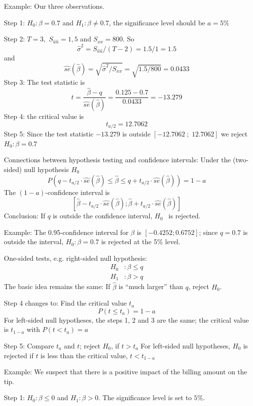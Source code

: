 \documentclass{article}
\begin{document}
Example: Our three observations.

Step 1: $H_{0}:\beta =0.7$ and $H_{1}:\beta \neq 0.7$, the significance
level should be $a=5\%$

Step 2: $T=3,$ $S_{\hat{u}\hat{u}}=1,5$ and $S_{xx}=800$. So%
\[
\hat{\sigma}^{2}=S_{\hat{u}\hat{u}}/\left( T-2\right) =1.5/1=1.5 
\]%
and%
\[
\widehat{se}(\hat{\beta})=\sqrt{\hat{\sigma}^{2}/S_{xx}}=\sqrt{1.5/800}%
=0.0433 
\]%
Step 3: The test statistic is%
\[
t=\frac{\hat{\beta}-q}{\widehat{se}(\hat{\beta})}=\frac{0.125-0.7}{0.0433}%
=-13.279 
\]%
Step 4: the critical value is%
\[
t_{a/2}=12.7062 
\]%
Step 5: Since the test statistic $-13.279$ is outside $[-12.7062\;;%
\;12.7062] $ we reject $H_{0}:\beta =0.7$

Connections between hypothesis testing and confidence intervals:
Under the (two-sided) null hypothesis $H_0$
\[ P(q-t_{a/2}\cdot \widehat{se}(\hat\beta)\le \hat\beta\le q+t_{a/2}\cdot \widehat{se}(\hat\beta))=1-a \]
The $(1-a)$-confidence interval is
\[ [\hat\beta-t_{a/2}\cdot \widehat{se}(\hat\beta); \hat\beta+t_{a/2}\cdot \widehat{se}(\hat\beta) ]\]
Conclusion: If $q$ is outside the confidence interval, $H_{0\text{ }}$%
is rejected.

Example: The 0.95-confidence interval for $\beta $ is $[-0.4252;0.6752]$; since $%
q=0.7 $ is outside the interval, $H_{0}:\beta =0.7$ is rejected at the 5\%
level.

One-sided tests, e.g. right-sided null hypothesis:
\begin{align*}
H_0 &: \beta\le q\\
H_1 &: \beta> q
\end{align*}
The basic idea remains the same: If $\hat{\beta}$ is \enquote{much larger} than $q$, reject $H_{0}$.

Step 4 changes to: Find the critical value $t_{a}$%
\begin{equation*}
P(t\leq t_{a})=1-a
\end{equation*}%
For left-sided null hypotheses, the steps 1, 2 and 3 are the same; the
critical value is $t_{1-a}$ with $P(t<t_{a})=a$

Step 5: Compare $t_{a}$ and $t$; reject $H_{0}$, if $t>t_{a}$
For left-sided null hypotheses, $H_{0}$ is rejected if $t$ is less
than the critical value, $t<t_{1-a}$

Example:
We suspect that there is a positive impact of the billing amount on the tip.

Step 1: $H_{0}:\beta \leq 0$ and $H_{1}:\beta >0$. The significance level is
set to $5\%.$
\end{document}
